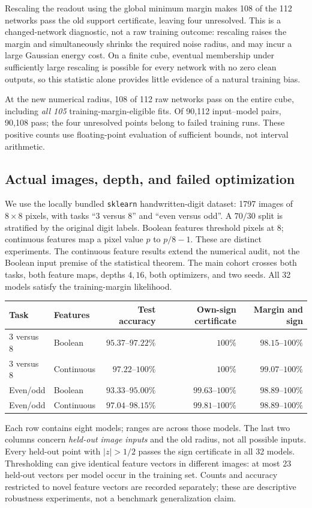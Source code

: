 Rescaling the readout using the global minimum margin makes 108 of the
112 networks pass the old support certificate, leaving four unresolved.
This is a changed-network diagnostic, not a raw training outcome:
rescaling raises the margin and simultaneously shrinks the required noise
radius, and may incur a large Gaussian energy cost. On a finite cube,
eventual membership under sufficiently large rescaling is possible for
every network with no zero clean outputs, so this statistic alone provides
little evidence of a natural training bias.

At the new numerical radius, 108 of 112 raw networks pass on the entire
cube, including \emph{all 105} training-margin-eligible fits. Of 90,112
input--model pairs, 90,108 pass; the four unresolved points belong to
failed training runs. These positive counts use floating-point evaluation
of sufficient bounds, not interval arithmetic.

\subsection{Actual images, depth, and failed optimization}

We use the locally bundled \texttt{sklearn} handwritten-digit dataset:
1797 images of $8\times8$ pixels, with tasks ``3 versus 8'' and
``even versus odd''. A $70/30$ split is stratified by the original digit
labels. Boolean features threshold pixels at $8$; continuous features
map a pixel value $p$ to $p/8-1$. These are distinct experiments. The
continuous feature results extend the numerical audit, not the Boolean
input premise of the statistical theorem. The main cohort crosses both
tasks, both feature maps, depths $4,16$, both optimizers, and two seeds.
All 32 models satisfy the training-margin likelihood.

\begin{center}
\begin{tabular}{llrrr}
\toprule
Task & Features & Test accuracy & Own-sign certificate & Margin and sign\\
\midrule
3 versus 8 & Boolean & $95.37$--$97.22\%$ & $100\%$ & $98.15$--$100\%$\\
3 versus 8 & Continuous & $97.22$--$100\%$ & $100\%$ & $99.07$--$100\%$\\
Even/odd & Boolean & $93.33$--$95.00\%$ & $99.63$--$100\%$ & $98.89$--$100\%$\\
Even/odd & Continuous & $97.04$--$98.15\%$ & $99.81$--$100\%$ & $98.89$--$100\%$\\
\bottomrule
\end{tabular}
\end{center}
Each row contains eight models; ranges are across those models. The last
two columns concern \emph{held-out image inputs} and the old radius,
not all possible inputs. Every held-out point with $|z|>1/2$ passes
the sign certificate in all 32 models. Thresholding can give identical
feature vectors in different images: at most 23 held-out vectors per
model occur in the training set. Counts and accuracy restricted to novel
feature vectors are recorded separately; these are descriptive robustness
experiments, not a benchmark generalization claim.


